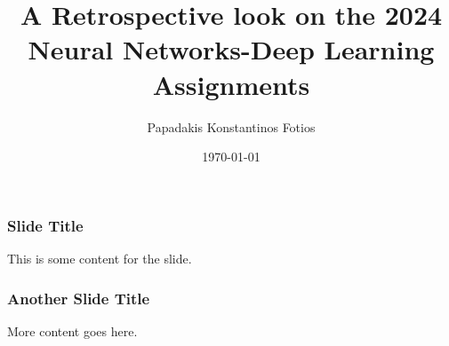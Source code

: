 \documentclass{beamer}
\title{A Retrospective look on the 2024 Neural Networks-Deep Learning Assignments}
\author{Papadakis Konstantinos Fotios}
\date{\today}
\begin{document}
\frame{\titlepage}

\begin{frame}
\frametitle{Slide Title}
This is some content for the slide.
\end{frame}

\begin{frame}
\frametitle{Another Slide Title}
More content goes here.
\end{frame}
\end{document}
